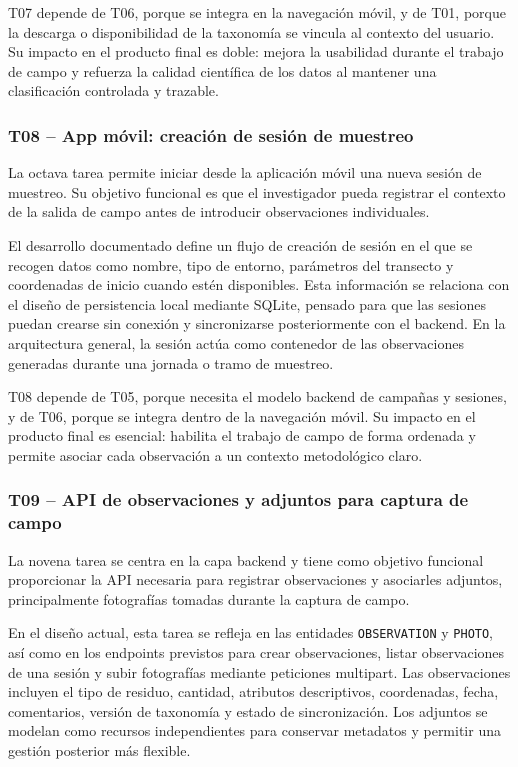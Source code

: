 T07 depende de T06, porque se integra en la navegación móvil, y de T01, porque la
descarga o disponibilidad de la taxonomía se vincula al contexto del usuario. Su
impacto en el producto final es doble: mejora la usabilidad durante el trabajo de
campo y refuerza la calidad científica de los datos al mantener una clasificación
controlada y trazable.

\subsubsection{T08 -- App móvil: creación de sesión de muestreo}

La octava tarea permite iniciar desde la aplicación móvil una nueva sesión de
muestreo. Su objetivo funcional es que el investigador pueda registrar el contexto
de la salida de campo antes de introducir observaciones individuales.

El desarrollo documentado define un flujo de creación de sesión en el que se
recogen datos como nombre, tipo de entorno, parámetros del transecto y coordenadas
de inicio cuando estén disponibles. Esta información se relaciona con el diseño de
persistencia local mediante SQLite, pensado para que las sesiones puedan crearse
sin conexión y sincronizarse posteriormente con el backend. En la arquitectura
general, la sesión actúa como contenedor de las observaciones generadas durante una
jornada o tramo de muestreo.

T08 depende de T05, porque necesita el modelo backend de campañas y sesiones, y de
T06, porque se integra dentro de la navegación móvil. Su impacto en el producto
final es esencial: habilita el trabajo de campo de forma ordenada y permite asociar
cada observación a un contexto metodológico claro.

\subsubsection{T09 -- API de observaciones y adjuntos para captura de campo}

La novena tarea se centra en la capa backend y tiene como objetivo funcional
proporcionar la API necesaria para registrar observaciones y asociarles adjuntos,
principalmente fotografías tomadas durante la captura de campo.

En el diseño actual, esta tarea se refleja en las entidades \texttt{OBSERVATION} y
\texttt{PHOTO}, así como en los endpoints previstos para crear observaciones,
listar observaciones de una sesión y subir fotografías mediante peticiones
multipart. Las observaciones incluyen el tipo de residuo, cantidad, atributos
descriptivos, coordenadas, fecha, comentarios, versión de taxonomía y estado de
sincronización. Los adjuntos se modelan como recursos independientes para conservar
metadatos y permitir una gestión posterior más flexible.


